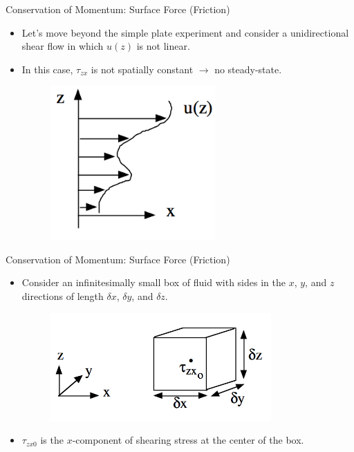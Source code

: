 \begin{frame}{Conservation of Momentum: Surface Force (Friction)}
\begin{itemize}
	\item Let's move beyond the simple plate experiment and consider a unidirectional shear flow in which $u(z)$ is not linear.
	\item In this case, $\tau_{zx}$ is not spatially constant $\rightarrow$ no steady-state.
	\begin{figure}
		\includegraphics[width=0.6\textwidth]{friction6.png}
	\end{figure}
\end{itemize}
\end{frame}
\begin{frame}{Conservation of Momentum: Surface Force (Friction)}
\begin{itemize}
	\item Consider an infinitesimally small box of fluid with sides in the $x$, $y$, and $z$ directions of length $\delta x$, $\delta y$, and $\delta z$.
	\begin{figure}
		\includegraphics[width=0.8\textwidth]{friction7.png}	
	\end{figure}
	\item $\tau_{zx0}$ is the $x$-component of shearing stress at the center of the box.
\end{itemize}
\end{frame}
